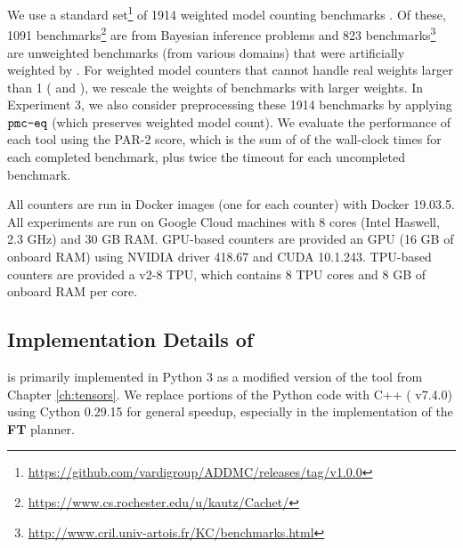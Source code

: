 We use a standard set\footnote{\url{https://github.com/vardigroup/ADDMC/releases/tag/v1.0.0}} of 1914 weighted model counting benchmarks \cite{DPV20}. Of these, 1091 benchmarks\footnote{\url{https://www.cs.rochester.edu/u/kautz/Cachet/}} are from Bayesian inference problems \cite{SBK05} and 823 benchmarks\footnote{\url{http://www.cril.univ-artois.fr/KC/benchmarks.html}} are unweighted benchmarks (from various domains) that were artificially weighted by \cite{DPV20}. For weighted model counters that cannot handle real weights larger than 1 ( and ), we rescale the weights of benchmarks with larger weights. In Experiment 3, we also consider preprocessing these 1914 benchmarks by applying $\texttt{\upshape pmc-eq}$ \cite{LM14} (which preserves weighted model count). %
We evaluate the performance of each tool using the PAR-2 score, which is the sum of of the wall-clock times for each completed benchmark, plus twice the timeout for each uncompleted benchmark.

All counters are run in Docker images (one for each counter) with Docker 19.03.5. All experiments are run on Google Cloud  machines with 8 cores (Intel Haswell, 2.3 GHz) and 30 GB RAM. GPU-based counters are provided an  GPU (16 GB of onboard RAM) using NVIDIA driver 418.67 and CUDA 10.1.243. TPU-based counters are provided a v2-8 TPU, which contains 8 TPU cores and 8 GB of onboard RAM per core.

\subsection{Implementation Details of }
\label{sec:experiments:impl}
 is primarily implemented in Python 3 as a modified version of the tool  from Chapter \ref{ch:tensors}. We replace portions of the Python code with C++ ( v7.4.0) using Cython 0.29.15 for general speedup, especially in the implementation of the \textbf{FT} planner.

